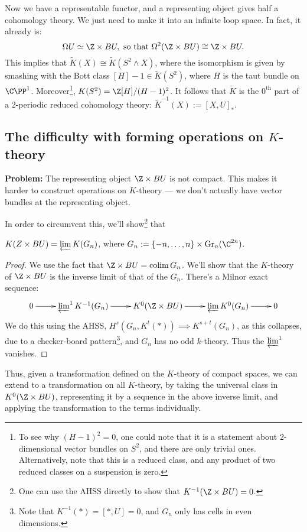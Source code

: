 \documentclass[11pt]{article}
\begin{document}
\begin{MarkusKtheory}

Now we have a representable functor, and a representing object gives half a cohomology theory. We just need to make it into an infinite loop space. In fact, it already is:
\[\Omega U\simeq\Z\times BU,\text{ so that }\Omega^2(\Z\times BU)\cong \Z\times BU.\]
This implies that $\widetilde K(X)\cong \widetilde K(S^2\wedge X)$, where the isomorphism is given by smashing with the Bott class $[H]-1\in\widetilde K(S^2)$, where $H$ is the taut bundle on $\CP^1$. Moreover\footnote{To see why $(H-1)^2=0$, one could note that it is a statement about 2-dimensional vector bundles on $S^2$, and there are only trivial ones. Alternatively, note that this is a reduced class, and any product of two reduced classes on a suspension is zero.}, $K(S^2)=\Z[H]/(H-1)^2$. It follows that $\widetilde K$ is the $0^\text{th}$ part of a 2-periodic reduced cohomology theory: $\widetilde K^{-1}(X):=[X,U]_*$.

\subsection*{The difficulty with forming operations on $K$-theory}
\textbf{Problem:} The representing object $\Z\times BU$ is not compact. This makes it harder to construct operations on $K$-theory --- we don't actually have vector bundles at the representing object.

In order to circumvent this, we'll show\footnote{One can use the AHSS directly to show that $K^{-1}(\Z\times BU)=0$.} that 
\begin{thm*}
$K(Z\times BU)=\varprojlim K(G_n)$, where $G_n:=\{-n,\ldots,n\}\times \Gr_{n}(\C^{2n})$.
\end{thm*}
\begin{proof}
We use the fact that $\Z\times BU=\colim G_n$. We'll show that the $K$-theory of $\Z\times BU$ is the inverse limit of that of the $G_n$. There's a Milnor exact sequence:
\[\xymatrix{
0\ar[r]&\varprojlim^1 K^{-1}(G_{n})\ar[r]&K^0(\Z\times BU)\ar[r]&\varprojlim K^0(G_{n})\ar[r]&0}\]
We do this using the AHSS, $H^s(G_{n},K^t(\ast))\implies K^{s+t}(G_{n})$, as this collapses, due to a checker-board pattern\footnote{%
Note that $K^{-1}(*)=[*,U]=0$, and $G_n$ only has cells in even dimensions.}, and $G_{n}$ has no odd $k$-theory. Thus the $\varprojlim^1$ vanishes.
\end{proof}
\noindent Thus, given a transformation defined on the $K$-theory of compact spaces, we can extend to a transformation on all $K$-theory, by taking the universal class in $K^0(\Z\times BU)$, representing it by a sequence in the above inverse limit, and applying the transformation to the terms individually.


\end{MarkusKtheory}
\end{document}

